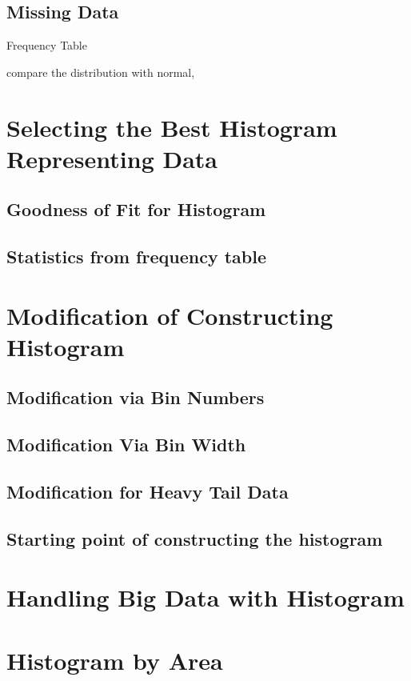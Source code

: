 \subsection{Missing Data}
 

Frequency Table



compare the distribution with normal,

\section{Selecting the Best Histogram Representing Data}
\subsection{Goodness of Fit for Histogram}
\subsection{Statistics from frequency table}
\section{Modification of Constructing Histogram}

\subsection{Modification via Bin Numbers}

\subsection{Modification Via Bin Width}

\subsection{Modification for Heavy Tail Data}

\subsection{Starting point of constructing the histogram}

\section{Handling Big Data with Histogram}

\section{Histogram by Area}



